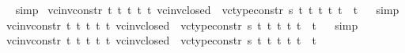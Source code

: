 \begin{isabellebody}
\isadelimproof
\ %
\endisadelimproof
%
\isatagproof
{}\isamarkupfalse%
\ simp%
\endisatagproof
{\isafoldproof}%
%
\isadelimproof
%
\endisadelimproof
\isanewline
{}\isamarkupfalse%
\ vc{\isacharunderscore}{\kern0pt}inv{\isacharunderscore}{\kern0pt}constr{\isacharunderscore}{\kern0pt}{}{}{\isacharcolon}{\kern0pt}{\isachardoublequoteopen}{\isasymforall}\ t{}\ t{}\ t{}\ t{}\ t{}{\isachardot}{\kern0pt}\ vc{\isacharunderscore}{\kern0pt}inv{\isacharunderscore}{\kern0pt}closed\ {}\ {\isacharparenleft}{\kern0pt}vc{\isacharunderscore}{\kern0pt}type{\isacharunderscore}{\kern0pt}constr{}\ s\ t{}\ t{}\ t{}\ t{}\ t{}{\isacharparenright}{\kern0pt}\ {\isacharequal}{\kern0pt}\ t{}{\isachardoublequoteclose}%
\isadelimproof
\ %
\endisadelimproof
%
\isatagproof
{}\isamarkupfalse%
\ simp%
\endisatagproof
{\isafoldproof}%
%
\isadelimproof
%
\endisadelimproof
\isanewline
{}\isamarkupfalse%
\ vc{\isacharunderscore}{\kern0pt}inv{\isacharunderscore}{\kern0pt}constr{\isacharunderscore}{\kern0pt}{}{}{\isacharcolon}{\kern0pt}{\isachardoublequoteopen}{\isasymforall}\ t{}\ t{}\ t{}\ t{}\ t{}{\isachardot}{\kern0pt}\ vc{\isacharunderscore}{\kern0pt}inv{\isacharunderscore}{\kern0pt}closed\ {}\ {\isacharparenleft}{\kern0pt}vc{\isacharunderscore}{\kern0pt}type{\isacharunderscore}{\kern0pt}constr{}\ s\ t{}\ t{}\ t{}\ t{}\ t{}{\isacharparenright}{\kern0pt}\ {\isacharequal}{\kern0pt}\ t{}{\isachardoublequoteclose}%
\isadelimproof
\ %
\endisadelimproof
%
\isatagproof
{}\isamarkupfalse%
\ simp%
\endisatagproof
{\isafoldproof}%
%
\isadelimproof
%
\endisadelimproof
\isanewline
{}\isamarkupfalse%
\ vc{\isacharunderscore}{\kern0pt}inv{\isacharunderscore}{\kern0pt}constr{\isacharunderscore}{\kern0pt}{}{}{\isacharcolon}{\kern0pt}{\isachardoublequoteopen}{\isasymforall}\ t{}\ t{}\ t{}\ t{}\ t{}{\isachardot}{\kern0pt}\ vc{\isacharunderscore}{\kern0pt}inv{\isacharunderscore}{\kern0pt}closed\ {}\ {\isacharparenleft}{\kern0pt}vc{\isacharunderscore}{\kern0pt}type{\isacharunderscore}{\kern0pt}constr{}\ s\ t{}\ t{}\ t{}\ t{}\ t{}{\isacharparenright}{\kern0pt}\ {\isacharequal}{\kern0pt}\ t{}{\isachardoublequoteclose}%

\end{isabellebody}
